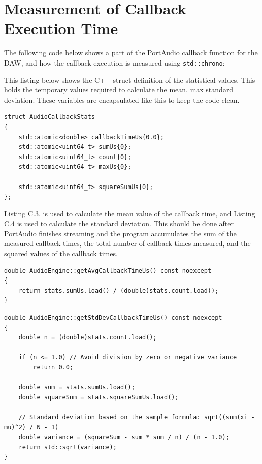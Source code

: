 \section{Measurement of Callback Execution Time}
\label{app:exec_time}

The following code below shows a part of the PortAudio callback function for the 
DAW, and how the callback execution is measured using \texttt{std::chrono}:




This listing below shows the C++ struct definition of the statistical values. 
This holds the temporary values required to calculate the mean, max standard 
deviation. These variables are encapsulated like this to keep the code clean.


\begin{lstlisting}[style=cppstyle, caption={Audio callback statistics structure}, label={lst:audiocallbackstats}]
struct AudioCallbackStats
{
    std::atomic<double> callbackTimeUs{0.0};
    std::atomic<uint64_t> sumUs{0};
    std::atomic<uint64_t> count{0};
    std::atomic<uint64_t> maxUs{0};

    std::atomic<uint64_t> squareSumUs{0};
};
\end{lstlisting}


Listing C.3. is used to calculate the mean value of the callback time, and Listing C.4 is used to calculate the standard deviation. 
This should be done after PortAudio finishes streaming and the program accumulates the sum of the measured callback times, 
the total number of callback times measured, and the squared values of the callback times.


\begin{lstlisting}[style=cppstyle, caption={Function to calculate the mean of the callback times}, 
    label={lst:mean_callback}]
double AudioEngine::getAvgCallbackTimeUs() const noexcept
{
    return stats.sumUs.load() / (double)stats.count.load();
}
\end{lstlisting}


\begin{lstlisting}[style=cppstyle, caption={Function to calculate the standard deviation of the callback times}, 
    label={lst:stddev_callback}]
double AudioEngine::getStdDevCallbackTimeUs() const noexcept
{
    double n = (double)stats.count.load();

    if (n <= 1.0) // Avoid division by zero or negative variance
        return 0.0;

    double sum = stats.sumUs.load();
    double squareSum = stats.squareSumUs.load();

    // Standard deviation based on the sample formula: sqrt((sum(xi - mu)^2) / N - 1)
    double variance = (squareSum - sum * sum / n) / (n - 1.0);
    return std::sqrt(variance);
}
\end{lstlisting}

